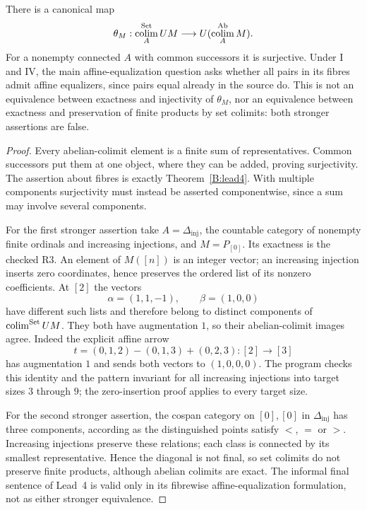 \begin{proposition}\label{B:lead4-qualification}
There is a canonical map
\[
 \theta_M:\operatorname*{colim}_A^{\mathrm{Set}}UM\longrightarrow U(\operatorname*{colim}_A^{\mathrm{Ab}}M).
\]
For a nonempty connected $A$ with common successors it is surjective. Under I and IV, the main affine-equalization question asks whether all pairs in its fibres admit affine equalizers, since pairs equal already in the source do. This is not an equivalence between exactness and injectivity of $\theta_M$, nor an equivalence between exactness and preservation of finite products by set colimits: both stronger assertions are false.
\end{proposition}
\begin{proof}
Every abelian-colimit element is a finite sum of representatives. Common successors put them at one object, where they can be added, proving surjectivity. The assertion about fibres is exactly Theorem~\ref{B:lead4}. With multiple components surjectivity must instead be asserted componentwise, since a sum may involve several components.

For the first stronger assertion take $A=\Delta_{\mathrm{inj}}$, the countable category of nonempty finite ordinals and increasing injections, and $M=P_{[0]}$. Its exactness is the checked R3. An element of $M([n])$ is an integer vector; an increasing injection inserts zero coordinates, hence preserves the ordered list of its nonzero coefficients. At $[2]$ the vectors
\[
 \alpha=(1,1,-1),\qquad\beta=(1,0,0)
\]
have different such lists and therefore belong to distinct components of $\operatorname*{colim}^{\mathrm{Set}}UM$. They both have augmentation $1$, so their abelian-colimit images agree. Indeed the explicit affine arrow
\[
 t=(0,1,2)-(0,1,3)+(0,2,3):[2]\longrightarrow[3]
\]
has augmentation $1$ and sends both vectors to $(1,0,0,0)$. The program  checks this identity and the pattern invariant for all increasing injections into target sizes $3$ through $9$; the zero-insertion proof applies to every target size.

For the second stronger assertion, the cospan category on $[0],[0]$ in $\Delta_{\mathrm{inj}}$ has three components, according as the distinguished points satisfy $<$, $=$ or $>$. Increasing injections preserve these relations; each class is connected by its smallest representative. Hence the diagonal is not final, so set colimits do not preserve finite products, although abelian colimits are exact. The informal final sentence of Lead~4 is valid only in its fibrewise affine-equalization formulation, not as either stronger equivalence.
\end{proof}

